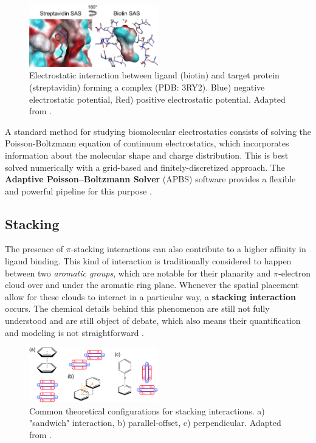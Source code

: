     \begin{figure}[H]
      \centering
      \includegraphics[width=0.5\textwidth]{figures/intro/electrostatics.png}
      \caption{\label{fig:intro/electrostatics} Electrostatic interaction between ligand (biotin) and target protein (streptavidin) forming a complex (PDB: 3RY2). Blue) negative electrostatic potential, Red) positive electrostatic potential. Adapted from \cite{electrostatics_2019}.}
    \end{figure}

    A standard method for studying biomolecular electrostatics consists of solving the Poisson-Boltzmann equation of continuum electrostatics, which incorporates information about the molecular shape and charge distribution. This is best solved numerically with a grid-based and finitely-discretized approach. The \textbf{Adaptive Poisson–Boltzmann Solver} (APBS) software provides a flexible and powerful pipeline for this purpose \cite{apbs_2004, apbs_2018, apbs_web, umol_apbs_2020}.

  \subsection{Stacking}
    The presence of $\pi$-stacking interactions can also contribute to a higher affinity in ligand binding. This kind of interaction is traditionally considered to happen between two \textit{aromatic groups}, which are notable for their planarity and $\pi$-electron cloud over and under the aromatic ring plane. Whenever the spatial placement allow for these clouds to interact in a particular way, a \textbf{stacking interaction} occurs. The chemical details behind this phenomenon are still not fully understood and are still object of debate, which also means their quantification and modeling is not straightforward \cite{stacking_binding_2020, stacking_trp_2022, stacking_general_2020}.

    \begin{figure}[H]
      \centering
      \includegraphics[width=0.5\textwidth]{figures/intro/stacking_configs.png}
      \caption{\label{fig:intro/stacking_configs} Common theoretical configurations for stacking interactions. a) "sandwich" interaction, b) parallel-offset, c) perpendicular. Adapted from \cite{stacking_general_2020}.}
    \end{figure}

